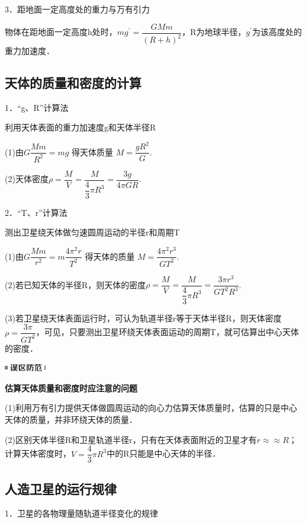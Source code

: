 3．距地面一定高度处的重力与万有引力

物体在距地面一定高度h处时，$m g^{\prime}=\dfrac{G M m}{(R+h)^{2}}$，R为地球半径，$g^{'}$为该高度处的重力加速度．



\subsection{天体的质量和密度的计算}

1．``g、R''计算法

利用天体表面的重力加速度g和天体半径R

(1)由$G \dfrac{M m}{R^{2}}=m g$ 得天体质量 $M=\dfrac{g R^{2}}{G}$.

(2)天体密度$\rho=\dfrac{M}{V}=\dfrac{M}{\dfrac{4}{3} \pi R^{3}}=\dfrac{3 g}{4 \pi G R}$.

2．``T、r''计算法

测出卫星绕天体做匀速圆周运动的半径r和周期T

(1)由$G \dfrac{M m}{r^{2}}=m \dfrac{4 \pi^{2} r}{T^{2}}$ 得天体的质量 $M=\dfrac{4 \pi^{2} r^{3}}{G T^{2}}$.

(2)若已知天体的半径R，则天体的密度$\rho=\dfrac{M}{V}=\dfrac{M}{\dfrac{4}{3} \pi R^{3}}=\dfrac{3 \pi r^{3}}{G T^{2} R^{3}}$.　

(3)若卫星绕天体表面运行时，可认为轨道半径r等于天体半径R，则天体密度$\rho=\dfrac{3 \pi}{G T^{2}}$，可见，只要测出卫星环绕天体表面运动的周期T，就可估算出中心天体的密度．


\begin{center}\includegraphics[width=0.71667in,height=0.13333in]{media/image34.png}

\textbf{估算天体质量和密度时应注意的问题}
\end{center}


(1)利用万有引力提供天体做圆周运动的向心力估算天体质量时，估算的只是中心天体的质量，并非环绕天体的质量．

(2)区别天体半径R和卫星轨道半径r，只有在天体表面附近的卫星才有$r\approx ≈R$；计算天体密度时，$V=\dfrac{4}{3} \pi R^{3}$中的R只能是中心天体的半径．

\newpage
\subsection{人造卫星的运行规律}

1．卫星的各物理量随轨道半径变化的规律

